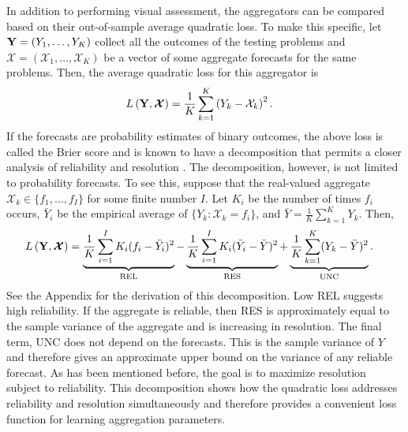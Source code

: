 \documentclass[11pt]{article}
\theoremstyle{definition}
\theoremstyle{definition}
\def\Y{{\bf Y}}
\begin{document}
In addition to performing visual assessment, the aggregators can be compared based on their out-of-sample average quadratic loss. To make this specific, let $\Y = (Y_1, \dots, Y_K)$ collect all the outcomes of the testing problems and $\boldsymbol{\mathcal{X}} = (\mathcal{X}_1, \dots, \mathcal{X}_K)$ be a vector of some aggregate forecasts for the same problems. Then, the average quadratic loss for this aggregator is
\begin{align*}
L\left(\Y, \boldsymbol{\mathcal{X}}\right) &= \frac{1}{K} \sum_{k=1}^K \left(Y_k - \mathcal{X}_k\right)^2.
\end{align*}
If the forecasts are probability estimates of binary outcomes, the above loss is called the Brier score and is known to have a decomposition that permits a closer analysis of  reliability and resolution \citep{murphy1973new, Brier}. The decomposition, however, is not limited to probability forecasts. To see this, suppose that the real-valued aggregate $\mathcal{X}_k \in \{f_1, \dots, f_I\}$ for some finite number $I$. Let $K_i$ be the number of times $f_i$ occurs, $\bar{Y}_i$ be the empirical average of $\{Y_k : \mathcal{X}_k = f_i\}$, and $\bar{Y} = \frac{1}{K} \sum_{k=1}^K Y_k$. Then,
\begin{align}
L\left(\Y, \boldsymbol{\mathcal{X}} \right)  &= \underbrace{\frac{1}{K} \sum_{i=1}^I K_i(f_i - \bar{Y}_i)^2}_\text{REL} - \underbrace{\frac{1}{K} \sum_{i=1}^I K_i(\bar{Y}_i-\bar{Y})^2}_\text{RES} + \underbrace{\frac{1}{K} \sum_{k=1}^K (Y_k - \bar{Y})^2}_\text{UNC}. \label{decomposition}
\end{align}
See the Appendix for the derivation of this decomposition. Low REL suggests high reliability. If the aggregate is reliable, then RES is approximately equal to the sample variance of the aggregate and 
is increasing in resolution.
The final term, UNC does not depend on the forecasts. This is the sample variance of $Y$ and therefore gives an approximate upper bound on the variance of any reliable forecast. As has been mentioned before, the goal is to maximize resolution subject to reliability. This decomposition shows how the quadratic loss addresses reliability and resolution simultaneously and therefore provides a convenient loss function for learning aggregation parameters. 
\end{document}
